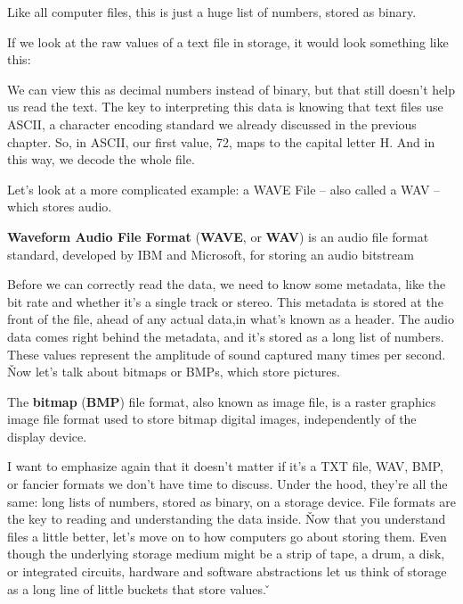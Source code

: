 Like all computer files, this is just a huge list of numbers, stored as binary.

\be
If we look at the raw values of a text file in storage, it would look something like this:


We can view this as decimal numbers instead of binary, but that still doesn't help us read the text. The key to
interpreting this data is knowing that text files use ASCII, a character encoding standard we already discussed in
the previous chapter. So, in ASCII, our first value, 72, maps to the capital letter H. And in this way, we decode the
whole file.
\ee

Let's look at a more complicated example: a WAVE File – also called a WAV – which stores audio.

\textbf{Waveform Audio File Format} (\textbf{WAVE}, or \textbf{WAV}) is an audio file format standard, developed by
IBM and Microsoft, for storing an audio bitstream
\ed

Before we can correctly read the data, we need to know some metadata, like the bit rate and whether it's a single
track or stereo. This metadata is stored at the front of the file, ahead of any actual data,in what's known as a
header. The audio data comes right behind the metadata, and it's stored as a long list of numbers. These values
represent the amplitude of sound captured many times per second. \v

Now let's talk about bitmaps or BMPs, which store pictures.

The \textbf{bitmap} (\textbf{BMP}) file format, also known as image file, is a raster graphics image file format used
to store bitmap digital images, independently of the display device.
\ed

I want to emphasize again that it doesn't matter if it's a TXT file, WAV, BMP, or fancier formats we don't have time
to discuss. Under the hood, they're all the same: long lists of numbers, stored as binary, on a storage device. File
formats are the key to reading and understanding the data inside. \v

Now that you understand files a little better, let's move on to how computers go about storing them. Even though the
underlying storage medium might be a strip of tape, a drum, a disk, or integrated circuits, hardware and software
abstractions let us think of storage as a long line of little buckets that store values. \v

